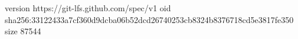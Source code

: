 version https://git-lfs.github.com/spec/v1
oid sha256:33122433a7cf360d9dcba06b52dcd26740253cb8324b8376718cd5e3817fe350
size 87544
